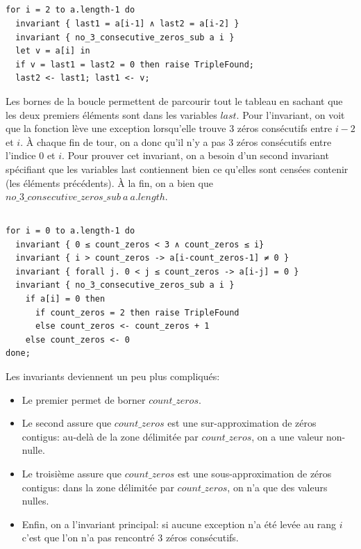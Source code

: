 ﻿\documentclass[10pt,a4paper]{article}
\begin{document}
\subsection{}
\begin{verbatim}
for i = 2 to a.length-1 do
  invariant { last1 = a[i-1] ∧ last2 = a[i-2] }
  invariant { no_3_consecutive_zeros_sub a i }
  let v = a[i] in
  if v = last1 = last2 = 0 then raise TripleFound;
  last2 <- last1; last1 <- v;
\end{verbatim}
Les bornes de la boucle permettent de parcourir tout le tableau en sachant que les deux premiers éléments sont dans les variables $last$.
Pour l'invariant, on voit que la fonction lève une exception lorsqu'elle trouve 3 zéros consécutifs entre $i-2$ et $i$. À chaque fin de tour, on a donc qu'il n'y a pas 3 zéros consécutifs entre l'indice $0$ et $i$. Pour prouver cet invariant, on a besoin d'un second invariant spécifiant que les variables \og last\fg{} contiennent bien ce qu'elles sont censées contenir (les éléments précédents). À la fin, on a bien que $no\_3\_consecutive\_zeros\_sub\ a\ a.length$.

\subsection{}
\label{q4}
\begin{verbatim}
for i = 0 to a.length-1 do
  invariant { 0 ≤ count_zeros < 3 ∧ count_zeros ≤ i}
  invariant { i > count_zeros -> a[i-count_zeros-1] ≠ 0 }
  invariant { forall j. 0 < j ≤ count_zeros -> a[i-j] = 0 }
  invariant { no_3_consecutive_zeros_sub a i }
    if a[i] = 0 then
      if count_zeros = 2 then raise TripleFound
      else count_zeros <- count_zeros + 1
    else count_zeros <- 0
done;
\end{verbatim}
Les invariants deviennent un peu plus compliqués:
\begin{itemize}
\item Le premier permet de borner $count\_zeros$.
\item Le second assure que $count\_zeros$ est une sur-approximation de zéros contigus: au-delà de la zone délimitée par $count\_zeros$, on a une valeur non-nulle.
\item Le troisième assure que $count\_zeros$ est une sous-approximation de zéros contigus: dans la zone délimitée par $count\_zeros$, on n'a que des valeurs nulles.
\item Enfin, on a l'invariant principal: si aucune exception n'a été levée au rang $i$ c'est que l'on n'a pas rencontré 3 zéros consécutifs.
\end{itemize}
\end{document}
